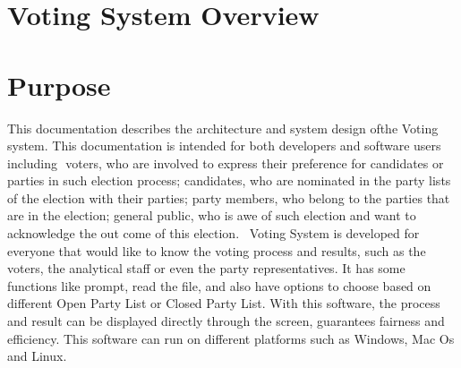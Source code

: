 \hypertarget{index_intro_sec}{}\section{Voting System Overview}\label{index_intro_sec}
\hypertarget{index_Purpose}{}\section{Purpose}\label{index_Purpose}
This documentation describes the architecture and system design of​ the Voting system. This documentation is intended for both developers and software users including ​ voters, who are involved to express their preference for candidates or parties in such election process; candidates, who are nominated in the party lists of the election with their parties; party members, who belong to the parties that are in the election; general public, who is awe of such election and want to acknowledge the out come of this election.~\newline
 Voting System is developed for everyone that would like to know the voting process and results, such as the voters, the analytical staff or even the party representatives. It has some functions like prompt, read the file, and also have options to choose based on different Open Party List or Closed Party List. With this software, the process and result can be displayed directly through the screen, guarantees fairness and efficiency. This software can run on different platforms such as Windows, Mac Os and Linux.~\newline
